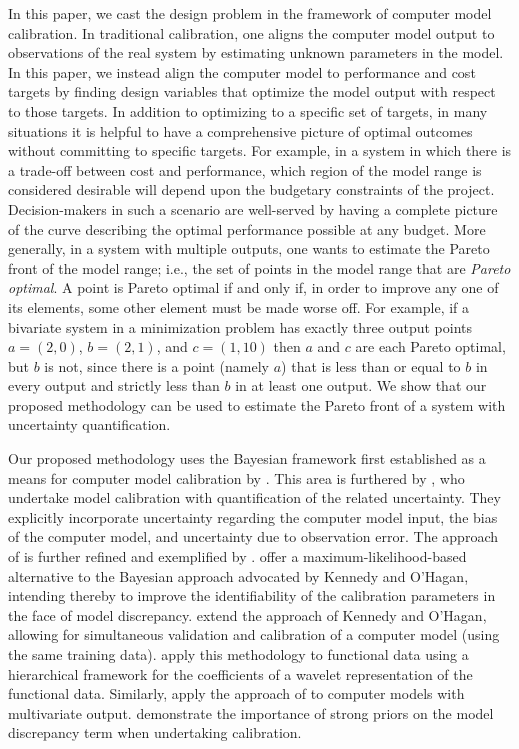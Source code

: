 \documentclass[12pt]{article}
\begin{document}
In this paper, we cast the design problem in the framework of computer model calibration.
%
In traditional calibration, one aligns the computer model output to observations of the real system by estimating unknown parameters in the model.
%
In this paper, we instead align the computer model to performance and cost targets by finding design variables that optimize the model output with respect to those targets.
%
In addition to optimizing to a specific set of targets, in many situations it is helpful to have a comprehensive picture of optimal outcomes without committing to specific targets.
%
For example, in a system in which there is a trade-off between cost and performance, which region of the model range is considered desirable will depend upon the budgetary constraints of the project.
%
Decision-makers in such a scenario are well-served by having a complete picture of the curve describing the optimal performance possible at any budget.
%
More generally, in a system with multiple outputs, one wants to estimate the Pareto front of the model range; i.e., the set of points in the model range that are {\em Pareto optimal}.
%
A point is Pareto optimal if and only if, in order to improve any one of its elements, some other element must be made worse off.
%
For example, if a bivariate system in a minimization problem has exactly three output points $a=(2,0)$, $b=(2,1)$, and $c=(1,10)$ then $a$ and $c$ are each Pareto optimal, but $b$ is not, since there is a point (namely $a$) that is less than or equal to $b$ in every output and strictly less than $b$ in at least one output.
%
We show that our proposed methodology can be used to estimate the Pareto front of a system with uncertainty quantification. 
%

Our proposed methodology uses the Bayesian framework first established as a means for computer model calibration by \cite{Kennedy2001}.
% 
This area is furthered by \cite{Higdon2004}, who undertake model calibration with quantification of the related uncertainty. 
They explicitly incorporate uncertainty regarding the computer model input, the bias of the computer model, and uncertainty due to observation error. 
%
The approach of \cite{Higdon2004} is further refined and exemplified by \cite{Williams2006}.
%
\cite{Loeppky2006} offer a maximum-likelihood-based alternative to the Bayesian approach advocated by Kennedy and O'Hagan, intending thereby to improve the identifiability of the calibration parameters in the face of model discrepancy. 
%
\cite{Bayarri2007} extend the approach of Kennedy and O'Hagan, allowing for simultaneous validation and calibration of a computer model (using the same training data). 
%
\cite{Bayarri} apply this methodology to functional data using a hierarchical framework for the coefficients of a wavelet representation of the functional data. 
%
Similarly, \cite{Paulo2012} apply the approach of \cite{Bayarri2007} to computer models with multivariate output.
%
\cite{Brynjarsdottir2014} demonstrate the importance of strong priors on the model discrepancy term when undertaking calibration.
%
\end{document}
